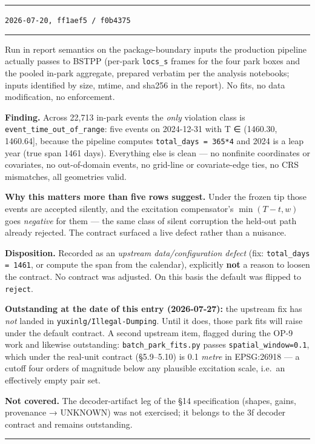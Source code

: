 \documentclass[
  10pt,
]{article}
\newenvironment{amendment}[2]{%
  \par\medskip\noindent
  {\color{amdcolor}\rule{\linewidth}{1pt}}\par\nobreak
  \vspace{-0.45\baselineskip}
  \noindent{\color{amdcolor}\textbf{#1}}\hfill{\color{amdcolor}\small\texttt{#2}}\par\nobreak
  \vspace{-0.35\baselineskip}
  {\color{amdcolor}\rule{\linewidth}{0.4pt}}\par\nobreak\smallskip
}{%
  \par\nobreak\vspace{-0.25\baselineskip}
  {\color{amdcolor}\rule{\linewidth}{1pt}}\par\medskip
}
\begin{document}
\begin{amendment}{A-3 --- §14 executed; result and its consequence}{2026-07-20, \texttt{ff1aef5} / \texttt{f0b4375}}
Run in report semantics on the package-boundary inputs the production pipeline actually passes to BSTPP (per-park \texttt{locs\_s} frames for the four park boxes and the pooled in-park aggregate, prepared verbatim per the analysis notebooks; inputs identified by size, mtime, and sha256 in the report). No fits, no data modification, no enforcement.

\textbf{Finding.} Across 22{,}713 in-park events the \emph{only} violation class is \texttt{event\_time\_out\_of\_range}: five events on 2024-12-31 with T ∈ (1460.30, 1460.64{]}, because the pipeline computes \texttt{total\_days = 365*4} and 2024 is a leap year (true span 1461 days). Everything else is clean --- no nonfinite coordinates or covariates, no out-of-domain events, no grid-line or covariate-edge ties, no CRS mismatches, all geometries valid.

\textbf{Why this matters more than five rows suggest.} Under the frozen tip those events are accepted silently, and the excitation compensator's \(\min(T-t, w)\) goes \emph{negative} for them --- the same class of silent corruption the held-out path already rejected. The contract surfaced a live defect rather than a nuisance.

\textbf{Disposition.} Recorded as an \emph{upstream data/configuration defect} (fix: \texttt{total\_days = 1461}, or compute the span from the calendar), explicitly \textbf{not} a reason to loosen the contract. No contract was adjusted. On this basis the default was flipped to \texttt{reject}.

\textbf{Outstanding at the date of this entry (2026-07-27):} the upstream fix has \emph{not} landed in \texttt{yuxinlg/Illegal-Dumping}. Until it does, those park fits will raise under the default contract. A second upstream item, flagged during the OP-9 work and likewise outstanding: \texttt{batch\_park\_fits.py} passes \texttt{spatial\_window=0.1}, which under the real-unit contract (§5.9--5.10) is 0.1 \emph{metre} in EPSG:26918 --- a cutoff four orders of magnitude below any plausible excitation scale, i.e.\ an effectively empty pair set.

\textbf{Not covered.} The decoder-artifact leg of the §14 specification (shapes, gains, provenance → UNKNOWN) was not exercised; it belongs to the 3f decoder contract and remains outstanding.
\end{amendment}
\end{document}
